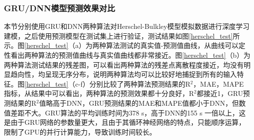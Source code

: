 \subsubsection{GRU/DNN模型预测效果对比}
本节分别使用GRU和DNN两种算法对Herschel-Bulkley模型模拟数据进行深度学习建模，之后使用预测模型在测试集上进行验证，测试结果如图\ref{herschel_test}所示。图\ref{herschel_test}（a）为两种算法测试的真实值-预测值曲线，从曲线可以定性看出两种算法的预测值曲线与真实值曲线都非常接近。图\ref{herschel_test}（b）为两种算法测试结果的残差图，可以看出两种算法的残差点离散程度接近，均没有明显趋向性，均呈现无序分布，说明两种算法均可以比较好地捕捉到所有的输入特征。图\ref{herschel_test}（c-f）分别比较了两种算法预测结果的R$^2$，MAE，MAPE指标，从结果中可以看出，两种算法的预测效果都十分良好，R$^2$都接近1，GRU预测结果的R$^2$值略高于DNN，GRU预测结果的MAE和MAPE值都小于DNN，但数值差距不大。GRU算法的平均训练时间为378 s，高于DNN的155 s 一倍以上，这是由于GRU网络的参数量更大，且由于其循环神经网络的特点，只能顺序运算，限制了GPU的并行计算能力，导致训练时间较长。

